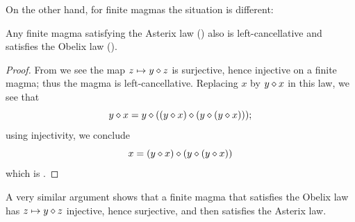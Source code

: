 On the other hand, for finite magmas the situation is different:

\begin{proposition}\label{asterix-obelix-finite}  Any finite magma satisfying the Asterix law () also is left-cancellative and satisfies the Obelix law ().
\end{proposition}

\begin{proof}  From  we see the map $z \mapsto y \diamond z$ is surjective, hence injective on a finite magma; thus the magma is left-cancellative.  Replacing $x$ by $y \diamond x$ in this law, we see that
$$ y \diamond x = y \diamond ((y\diamond x) \diamond (y \diamond (y \diamond x)));$$
using injectivity, we conclude
$$ x = (y\diamond x) \diamond (y \diamond (y \diamond x))$$
which is .
\end{proof}

A very similar argument shows that a finite magma that satisfies the Obelix law has $z \mapsto y \diamond z$ injective, hence surjective, and then satisfies the Asterix law.

